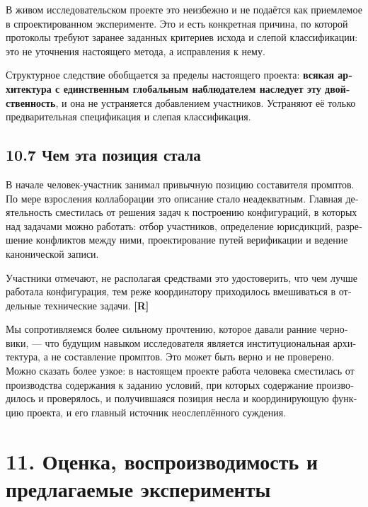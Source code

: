\begin{russian}
В живом исследовательском проекте это неизбежно и не подаётся как приемлемое в спроектированном эксперименте. Это и есть конкретная причина, по которой протоколы  требуют заранее заданных критериев исхода и слепой классификации: это не уточнения настоящего метода, а исправления к нему.

Структурное следствие обобщается за пределы настоящего проекта: \textbf{всякая архитектура с единственным глобальным наблюдателем наследует эту двойственность}, и она не устраняется добавлением участников. Устраняют её только предварительная спецификация и слепая классификация.


\subsection*{10.7 Чем эта позиция стала}
\label{sec:ru:10.7}

В начале человек-участник занимал привычную позицию составителя промптов. По мере взросления коллаборации это описание стало неадекватным. Главная деятельность сместилась от решения задач к построению конфигураций, в которых над задачами можно работать: отбор участников, определение юрисдикций, разрешение конфликтов между ними, проектирование путей верификации и ведение канонической записи.

Участники отмечают, не располагая средствами это удостоверить, что чем лучше работала конфигурация, тем реже координатору приходилось вмешиваться в отдельные технические задачи. \textbf{[R]}

Мы сопротивляемся более сильному прочтению, которое давали ранние черновики, — что будущим навыком исследователя является институциональная архитектура, а не составление промптов. Это может быть верно и не проверено. Можно сказать более узкое: в настоящем проекте работа человека сместилась от производства содержания к заданию условий, при которых содержание производилось и проверялось, и получившаяся позиция несла и координирующую функцию проекта, и его главный источник неослеплённого суждения.


\section*{11. Оценка, воспроизводимость и предлагаемые эксперименты}
\label{sec:ru:11}



\end{russian}
